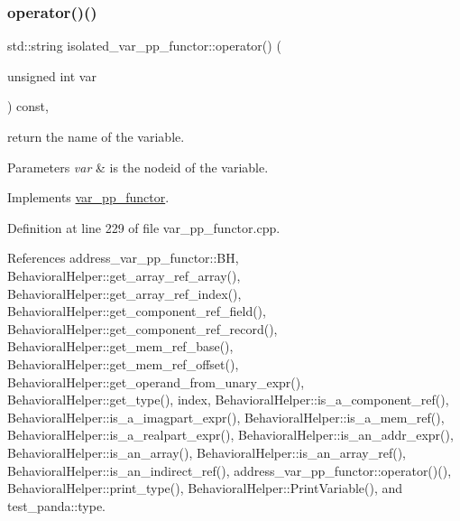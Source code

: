\subsubsection{\texorpdfstring{operator()()}{operator()()}}
{\footnotesize\ttfamily std\+::string isolated\+\_\+var\+\_\+pp\+\_\+functor\+::operator() (\begin{DoxyParamCaption}\item[{unsigned int}]{var }\end{DoxyParamCaption}) const\hspace{0.3cm}{\ttfamily [override]}, {\ttfamily [virtual]}}



return the name of the variable. 


\begin{DoxyParams}{Parameters}
{\em var} & is the nodeid of the variable. \\
\hline
\end{DoxyParams}


Implements \hyperlink{structvar__pp__functor_a6bcbd4e1551ac2584638ef70ecc6f361}{var\+\_\+pp\+\_\+functor}.



Definition at line 229 of file var\+\_\+pp\+\_\+functor.\+cpp.



References address\+\_\+var\+\_\+pp\+\_\+functor\+::\+BH, Behavioral\+Helper\+::get\+\_\+array\+\_\+ref\+\_\+array(), Behavioral\+Helper\+::get\+\_\+array\+\_\+ref\+\_\+index(), Behavioral\+Helper\+::get\+\_\+component\+\_\+ref\+\_\+field(), Behavioral\+Helper\+::get\+\_\+component\+\_\+ref\+\_\+record(), Behavioral\+Helper\+::get\+\_\+mem\+\_\+ref\+\_\+base(), Behavioral\+Helper\+::get\+\_\+mem\+\_\+ref\+\_\+offset(), Behavioral\+Helper\+::get\+\_\+operand\+\_\+from\+\_\+unary\+\_\+expr(), Behavioral\+Helper\+::get\+\_\+type(), index, Behavioral\+Helper\+::is\+\_\+a\+\_\+component\+\_\+ref(), Behavioral\+Helper\+::is\+\_\+a\+\_\+imagpart\+\_\+expr(), Behavioral\+Helper\+::is\+\_\+a\+\_\+mem\+\_\+ref(), Behavioral\+Helper\+::is\+\_\+a\+\_\+realpart\+\_\+expr(), Behavioral\+Helper\+::is\+\_\+an\+\_\+addr\+\_\+expr(), Behavioral\+Helper\+::is\+\_\+an\+\_\+array(), Behavioral\+Helper\+::is\+\_\+an\+\_\+array\+\_\+ref(), Behavioral\+Helper\+::is\+\_\+an\+\_\+indirect\+\_\+ref(), address\+\_\+var\+\_\+pp\+\_\+functor\+::operator()(), Behavioral\+Helper\+::print\+\_\+type(), Behavioral\+Helper\+::\+Print\+Variable(), and test\+\_\+panda\+::type.

